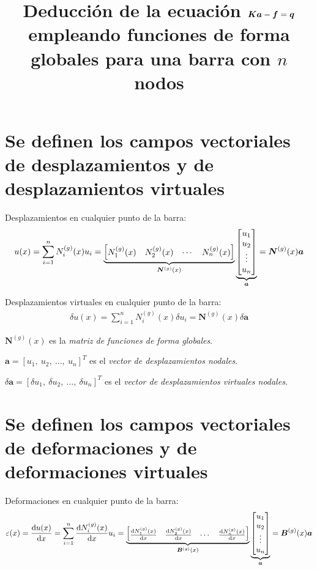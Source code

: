 \documentclass[12pt,letterpaper,landscape]{article}
\title{Deducción de la ecuación $\ma{K}\ve{a} - \ma{f} = \ma{q}$ empleando funciones de forma globales para una barra con $n$ nodos}
\date{}
\newcommand{\ve}[1]{{\boldsymbol{#1}}}
\newcommand{\ma}[1]{{\boldsymbol{#1}}}
\newcommand{\dd}{\operatorname{d} \!}
\begin{document}
   \maketitle

\section{Se definen los campos vectoriales de desplazamientos y  de desplazamientos virtuales}

Desplazamientos en cualquier punto de la barra:
\begin{align}
u(x) = \sum_{i=1}^n N_i^{(g)}(x) u_i = 
\underbrace{%
   \begin{bmatrix}
   N_1^{(g)}(x) & N_2^{(g)}(x) & \cdots &N_n^{(g)}(x)
   \end{bmatrix}}_{\ma{N}^{(g)}(x)}
   \underbrace{\begin{bmatrix}
      u_1 \\ u_2 \\ \vdots \\u_n
   \end{bmatrix}%
}_{\ma{a}}
= \ma{N}^{(g)}(x)  \ve{a}
\end{align}

Desplazamientos virtuales en cualquier punto de la barra:
\begin{align}
\delta u(x) = \sum_{i=1}^n N_i^{(g)}(x) \delta u_i = \ma{N}^{(g)}(x) \delta \ve{a}
\end{align}

$\ma{N}^{(g)}(x)$ es la \emph{matriz de funciones de forma globales}.

$\ve{a} = [u_1,\ u_2, \ \ldots, \ u_n]^T$ es el \emph{vector de desplazamientos nodales}.

$\delta\ve{a} = [\delta u_1,\ \delta u_2,\ \ldots, \ \delta u_n]^T$ es el \emph{vector de desplazamientos virtuales nodales}.

\newpage

\section{Se definen los campos vectoriales de deformaciones y  de deformaciones virtuales}

Deformaciones  en cualquier punto de la barra:
\begin{align}
\varepsilon(x) = \frac{\dd u(x)}{\dd x} = \sum_{i=1}^n \frac{\dd N_i^{(g)}(x)}{\dd x} u_i = 
\underbrace{%
   \begin{bmatrix}
      \frac{\dd N_1^{(g)}(x)}{\dd x} & 
      \frac{\dd N_2^{(g)}(x)}{\dd x} & 
      \cdots &
      \frac{\dd N_n^{(g)}(x)}{\dd x}
      \end{bmatrix}%
   }_{\ma{B}^{(g)}(x)}
   \underbrace{%
      \begin{bmatrix}
         u_1 \\ u_2 \\ \vdots \\ u_n
      \end{bmatrix}%
   }_{\ma{a}} = 
\ma{B}^{(g)}(x)  \ve{a}
\end{align}
\end{document}
